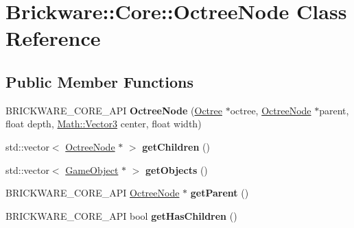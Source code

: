 \hypertarget{classBrickware_1_1Core_1_1OctreeNode}{}\section{Brickware\+:\+:Core\+:\+:Octree\+Node Class Reference}
\label{classBrickware_1_1Core_1_1OctreeNode}
\subsection*{Public Member Functions}
\begin{DoxyCompactItemize}
\item 
\hypertarget{classBrickware_1_1Core_1_1OctreeNode_a2feceff6b7889e7435b6957b67af564a}{}B\+R\+I\+C\+K\+W\+A\+R\+E\+\_\+\+C\+O\+R\+E\+\_\+\+A\+P\+I {\bfseries Octree\+Node} (\hyperlink{classBrickware_1_1Core_1_1Octree}{Octree} $\ast$octree, \hyperlink{classBrickware_1_1Core_1_1OctreeNode}{Octree\+Node} $\ast$parent, float depth, \hyperlink{classBrickware_1_1Math_1_1Vector3}{Math\+::\+Vector3} center, float width)\label{classBrickware_1_1Core_1_1OctreeNode_a2feceff6b7889e7435b6957b67af564a}

\item 
\hypertarget{classBrickware_1_1Core_1_1OctreeNode_a919866b5aafdd98e696a28b8288e1731}{}std\+::vector$<$ \hyperlink{classBrickware_1_1Core_1_1OctreeNode}{Octree\+Node} $\ast$ $>$ {\bfseries get\+Children} ()\label{classBrickware_1_1Core_1_1OctreeNode_a919866b5aafdd98e696a28b8288e1731}

\item 
\hypertarget{classBrickware_1_1Core_1_1OctreeNode_a1493f7b54456c2395caf6ea868a38873}{}std\+::vector$<$ \hyperlink{classBrickware_1_1Core_1_1GameObject}{Game\+Object} $\ast$ $>$ {\bfseries get\+Objects} ()\label{classBrickware_1_1Core_1_1OctreeNode_a1493f7b54456c2395caf6ea868a38873}

\item 
\hypertarget{classBrickware_1_1Core_1_1OctreeNode_ab44a721dbbd32498914a2a67768303e6}{}B\+R\+I\+C\+K\+W\+A\+R\+E\+\_\+\+C\+O\+R\+E\+\_\+\+A\+P\+I \hyperlink{classBrickware_1_1Core_1_1OctreeNode}{Octree\+Node} $\ast$ {\bfseries get\+Parent} ()\label{classBrickware_1_1Core_1_1OctreeNode_ab44a721dbbd32498914a2a67768303e6}

\item 
\hypertarget{classBrickware_1_1Core_1_1OctreeNode_ae8e8050062daf699f6f188ad95b256d5}{}B\+R\+I\+C\+K\+W\+A\+R\+E\+\_\+\+C\+O\+R\+E\+\_\+\+A\+P\+I bool {\bfseries get\+Has\+Children} ()\label{classBrickware_1_1Core_1_1OctreeNode_ae8e8050062daf699f6f188ad95b256d5}


\end{DoxyCompactItemize}
